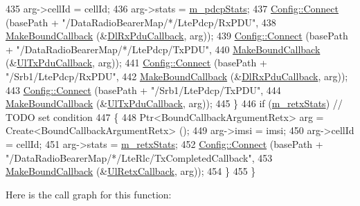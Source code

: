 \begin{DoxyCode}
435       arg->cellId = cellId; 
436       arg->stats = \hyperlink{classns3_1_1RadioBearerStatsConnector_a984690769317e9eddba15e49170f10d9}{m\_pdcpStats};
437       \hyperlink{group__config_ga4014f151241cd0939b6cb64409605736}{Config::Connect} (basePath + \textcolor{stringliteral}{"/DataRadioBearerMap/*/LtePdcp/RxPDU"},
438                        \hyperlink{group__makeboundcallback_ga1725d6362e6065faa0709f7c93f8d770}{MakeBoundCallback} (&\hyperlink{namespacens3_ae4fb5123d8a56fce742428b530ec4197}{DlRxPduCallback}, arg));
439       \hyperlink{group__config_ga4014f151241cd0939b6cb64409605736}{Config::Connect} (basePath + \textcolor{stringliteral}{"/DataRadioBearerMap/*/LtePdcp/TxPDU"},
440                        \hyperlink{group__makeboundcallback_ga1725d6362e6065faa0709f7c93f8d770}{MakeBoundCallback} (&\hyperlink{namespacens3_ae624428f0992ac62a3c5f2e7318fb98e}{UlTxPduCallback}, arg));
441       \hyperlink{group__config_ga4014f151241cd0939b6cb64409605736}{Config::Connect} (basePath + \textcolor{stringliteral}{"/Srb1/LtePdcp/RxPDU"},
442                        \hyperlink{group__makeboundcallback_ga1725d6362e6065faa0709f7c93f8d770}{MakeBoundCallback} (&\hyperlink{namespacens3_ae4fb5123d8a56fce742428b530ec4197}{DlRxPduCallback}, arg));
443       \hyperlink{group__config_ga4014f151241cd0939b6cb64409605736}{Config::Connect} (basePath + \textcolor{stringliteral}{"/Srb1/LtePdcp/TxPDU"},
444                        \hyperlink{group__makeboundcallback_ga1725d6362e6065faa0709f7c93f8d770}{MakeBoundCallback} (&\hyperlink{namespacens3_ae624428f0992ac62a3c5f2e7318fb98e}{UlTxPduCallback}, arg));
445     \}
446   \textcolor{keywordflow}{if} (\hyperlink{classns3_1_1RadioBearerStatsConnector_ad6d3ef18f579f2da0e2bee4f1850e205}{m\_retxStats}) \textcolor{comment}{// TODO set condition}
447     \{
448       Ptr<BoundCallbackArgumentRetx> arg = Create<BoundCallbackArgumentRetx> ();
449       arg->imsi = imsi;
450       arg->cellId = cellId; 
451       arg->stats = \hyperlink{classns3_1_1RadioBearerStatsConnector_ad6d3ef18f579f2da0e2bee4f1850e205}{m\_retxStats};
452       \hyperlink{group__config_ga4014f151241cd0939b6cb64409605736}{Config::Connect} (basePath + \textcolor{stringliteral}{"/DataRadioBearerMap/*/LteRlc/TxCompletedCallback"},
453          \hyperlink{group__makeboundcallback_ga1725d6362e6065faa0709f7c93f8d770}{MakeBoundCallback} (&\hyperlink{namespacens3_a80a98b047bc7a9039be0e3e1cd3bb927}{UlRetxCallback}, arg));
454     \}
455 \}
\end{DoxyCode}


Here is the call graph for this function\+:




